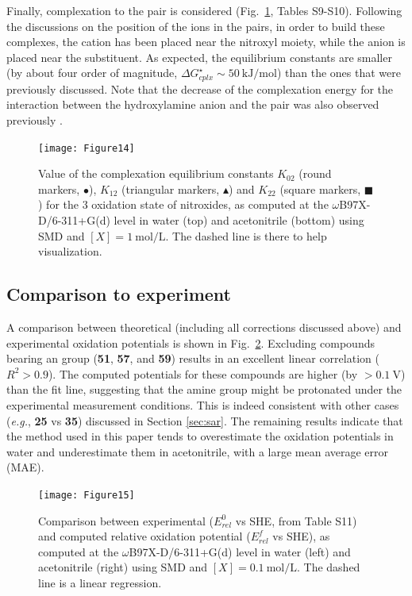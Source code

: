 \documentclass[review,preprint]{elsarticle}
\begin{document}
Finally, complexation to the  pair is considered (Fig.~\ref{fig:Kx2}, Tables S9-S10). Following the discussions on the position of the ions in the pairs, in order to build these complexes, the cation has been placed near the nitroxyl moiety, while the anion is placed near the substituent.
As expected, the equilibrium constants are smaller (by about four order of magnitude, $\Delta G^\star_{cplx} \sim \SI{50}{\kilo\joule\per\mole}$) than the ones that were previously discussed.
Note that the decrease of the complexation energy for the interaction between the hydroxylamine anion and the pair was also observed previously \cite{wylieImprovedPerformanceAllOrganic2019a}.


\begin{figure}[!h]
\centering
\texttt{[image: Figure14]}
\caption{Value of the complexation equilibrium constants $K_{02}$ (round markers, $\bullet$), $K_{12}$ (triangular markers, $\blacktriangle$) and $K_{22}$ (square markers, $\blacksquare$) for the 3 oxidation state of nitroxides, as computed at the $\omega$B97X-D/6-311+G(d) level in water (top) and acetonitrile (bottom) using SMD and $[X]=\SI{1}{\mole\per\liter}$.  The dashed line is there to help visualization. }
\label{fig:Kx2}
\end{figure}

\clearpage
\subsection{Comparison to experiment} \label{sec:exp}

A comparison between theoretical (including all corrections discussed above) and experimental oxidation potentials is shown in Fig.~\ref{fig:expvstheo}. Excluding compounds bearing an  group (\textbf{51}, \textbf{57}, and \textbf{59}) results in an excellent linear correlation ($R^2>0.9$). The computed potentials for these compounds are higher (by $>\SI{0.1}{\volt}$) than the fit line, suggesting that the amine group might be protonated under the experimental measurement conditions. This is indeed consistent with other cases (\textit{e.g.}, \textbf{25} vs \textbf{35}) discussed in Section \ref{sec:sar}. The remaining results indicate that the method used in this paper tends to overestimate the oxidation potentials in water and underestimate them in acetonitrile, with a large mean average error (MAE).


\begin{figure}[!h]
	\centering
	\texttt{[image: Figure15]}
	\caption{Comparison between experimental ($E^0_{rel} $ vs SHE, from Table S11) and computed relative oxidation potential ($E^f_{rel}$ vs SHE), as computed at the $\omega$B97X-D/6-311+G(d) level in water (left) and acetonitrile (right) using SMD and $[X]=\SI{0.1}{\mole\per\liter}$.  The dashed line is a linear regression.}
	\label{fig:expvstheo}
\end{figure}
\end{document}
